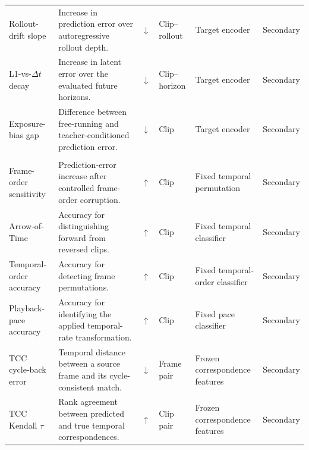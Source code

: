\begin{table}[t]
\begin{tabularx}{\textwidth}{
    p{}
    p{}
    p{}
    p{}
    p{}
    X
}
\midrule
\rowcolor{AttrGold}
\multicolumn{6}{l}{\textbf{Prediction-stability diagnostics}}
\\
\midrule

Rollout-drift slope
&
Increase in prediction error over autoregressive rollout depth.
&
\(\downarrow\)
&
Clip--rollout
&
Target encoder
&
Secondary
\\

L1-vs-\(\Delta t\) decay
&
Increase in latent error over the evaluated future horizons.
&
\(\downarrow\)
&
Clip--horizon
&
Target encoder
&
Secondary
\\

Exposure-bias gap
&
Difference between free-running and teacher-conditioned prediction
error.
&
\(\downarrow\)
&
Clip
&
Target encoder
&
Secondary
\\

\midrule
\rowcolor{AttrGray}
\multicolumn{6}{l}{\textbf{Temporal diagnostics}}
\\
\midrule

Frame-order sensitivity
&
Prediction-error increase after controlled frame-order corruption.
&
\(\uparrow\)
&
Clip
&
Fixed temporal permutation
&
Secondary
\\

Arrow-of-Time
&
Accuracy for distinguishing forward from reversed clips.
&
\(\uparrow\)
&
Clip
&
Fixed temporal classifier
&
Secondary
\\

Temporal-order accuracy
&
Accuracy for detecting frame permutations.
&
\(\uparrow\)
&
Clip
&
Fixed temporal-order classifier
&
Secondary
\\

Playback-pace accuracy
&
Accuracy for identifying the applied temporal-rate transformation.
&
\(\uparrow\)
&
Clip
&
Fixed pace classifier
&
Secondary
\\

TCC cycle-back error
&
Temporal distance between a source frame and its cycle-consistent
match.
&
\(\downarrow\)
&
Frame pair
&
Frozen correspondence features
&
Secondary
\\

TCC Kendall \(\tau\)
&
Rank agreement between predicted and true temporal correspondences.
&
\(\uparrow\)
&
Clip pair
&
Frozen correspondence features
&
Secondary
\\

\bottomrule
\end{tabularx}
\end{table}



